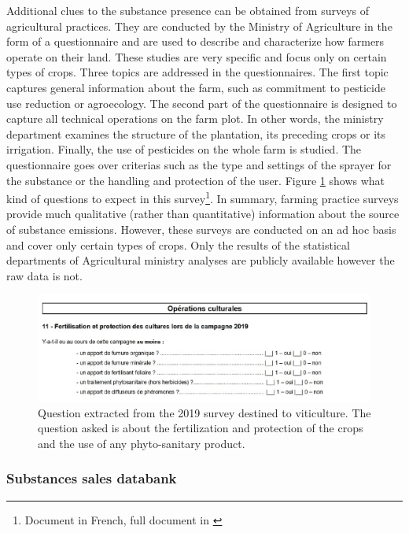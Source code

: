 Additional clues to the substance presence can be obtained from surveys of agricultural practices. They are conducted by the Ministry of Agriculture in the form of a questionnaire and are used to describe and characterize how farmers operate on their land. These studies are very specific and focus only on certain types of crops. Three topics are addressed in the questionnaires. The first topic captures general information about the farm, such as commitment to pesticide use reduction or agroecology. The second part of the questionnaire is designed to capture all technical operations on the farm plot. In other words, the ministry department examines the structure of the plantation, its preceding crops or its irrigation. Finally, the use of pesticides on the whole farm is studied. The questionnaire goes over criterias such as the type and settings of the sprayer for the substance or the handling and protection of the user.  
Figure \ref{fig:PK1} shows what kind of questions to expect in this survey\footnote{Document in French, full document in \cite{PK}}. In summary, farming practice surveys provide much qualitative (rather than quantitative) information about the source of substance emissions. However, these surveys are conducted on an ad hoc basis and cover only certain types of crops. Only the results of the statistical departments of Agricultural ministry analyses \cite{PK2} are publicly available however the raw data is not. 

\begin{figure}[ht]
    \centering
    \includegraphics[scale=0.75]{figs/Chap3/PK1.pdf}
    \caption{Question extracted from the 2019 survey destined to viticulture. The question asked is about the fertilization and protection of the crops and the use of any phyto-sanitary product.}
    \label{fig:PK1}
\end{figure}

\subsubsection{Substances sales databank}

